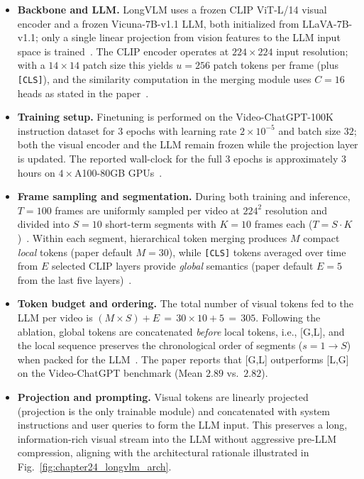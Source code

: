\begin{enrichment}
\begin{enrichment}
        \begin{itemize}
            \item \textbf{Backbone and LLM.} LongVLM uses a frozen CLIP ViT-L/14 visual encoder and a frozen Vicuna-7B-v1.1 LLM, both initialized from LLaVA-7B-v1.1; only a single linear projection from vision features to the LLM input space is trained~\cite[Sec.~4.1]{weng2024_longvlm}. The CLIP encoder operates at $224{\times}224$ input resolution; with a $14{\times}14$ patch size this yields $u{=}256$ patch tokens per frame (plus \texttt{[CLS]}), and the similarity computation in the merging module uses $C{=}16$ heads as stated in the paper~\cite[Sec.~3.2]{weng2024_longvlm}. 
            \item \textbf{Training setup.} Finetuning is performed on the Video-ChatGPT-100K instruction dataset for $3$ epochs with learning rate $2{\times}10^{-5}$ and batch size $32$; both the visual encoder and the LLM remain frozen while the projection layer is updated. The reported wall-clock for the full $3$ epochs is approximately $3$ hours on $4\times$A100-80GB GPUs~\cite[Sec.~4.1]{weng2024_longvlm}. 
            \item \textbf{Frame sampling and segmentation.} During both training and inference, $T{=}100$ frames are uniformly sampled per video at $224^2$ resolution and divided into $S{=}10$ short-term segments with $K{=}10$ frames each ($T{=}S\!\cdot\!K$)~\cite[Sec.~4.1]{weng2024_longvlm}. Within each segment, hierarchical token merging produces $M$ compact \emph{local} tokens (paper default $M{=}30$), while \texttt{[CLS]} tokens averaged over time from $E$ selected CLIP layers provide \emph{global} semantics (paper default $E{=}5$ from the last five layers)~\cite[Sec.~3; Sec.~4.1]{weng2024_longvlm}. 
            \item \textbf{Token budget and ordering.} The total number of visual tokens fed to the LLM per video is $(M\!\times\!S){+}E \,=\, 30\times 10 + 5 \,=\, 305$. Following the ablation, global tokens are concatenated \emph{before} local tokens, i.e., [G,L], and the local sequence preserves the chronological order of segments (\(s{=}1\!\to\!S\)) when packed for the LLM~\cite[Fig.~2; Tab.~3]{weng2024_longvlm}. The paper reports that [G,L] outperforms [L,G] on the Video-ChatGPT benchmark (Mean $2.89$ vs.\ $2.82$). 
            \item \textbf{Projection and prompting.} Visual tokens are linearly projected (projection is the only trainable module) and concatenated with system instructions and user queries to form the LLM input. This preserves a long, information-rich visual stream into the LLM without aggressive pre-LLM compression, aligning with the architectural rationale illustrated in Fig.~\ref{fig:chapter24_longvlm_arch}. 
        \end{itemize}
        

\end{enrichment}
\end{enrichment}
